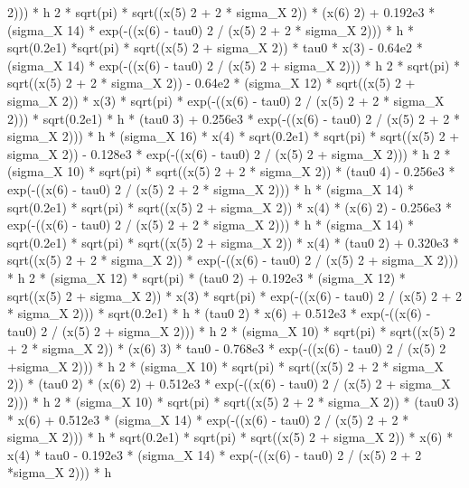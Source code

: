 \begin{maplegroup}
 2))) * h  2 * sqrt(pi) * sqrt((x(5)  2 + 2 * sigma\_X  2)) * (x(6)  2) + 0.192e3 * (sigma\_X  14) * exp(-((x(6) - tau0)  2 / (x(5)  2 + 2 * sigma\_X  2))) * h * sqrt(0.2e1) *sqrt(pi) * sqrt((x(5)  2 + sigma\_X  2)) * tau0 * x(3) - 0.64e2 * (sigma\_X  14) * exp(-((x(6) - tau0)  2 / (x(5)  2 + sigma\_X  2))) * h  2 * sqrt(pi) * sqrt((x(5)  2 + 2 * sigma\_X  2)) - 0.64e2 * (sigma\_X  12) * sqrt((x(5)  2 + sigma\_X  2)) * x(3) * sqrt(pi) * exp(-((x(6) - tau0)  2 / (x(5)  2 + 2 * sigma\_X  2))) * sqrt(0.2e1) * h * (tau0  3) + 0.256e3 * exp(-((x(6) - tau0)  2 / (x(5)  2 + 2 * sigma\_X  2))) * h * (sigma\_X  16) * x(4) * sqrt(0.2e1) * sqrt(pi) * sqrt((x(5)  2 + sigma\_X  2)) - 0.128e3 * exp(-((x(6) - tau0)  2 / (x(5)  2 + sigma\_X  2))) * h  2 * (sigma\_X  10) * sqrt(pi) * sqrt((x(5)  2 + 2 * sigma\_X  2)) * (tau0  4) - 0.256e3 * exp(-((x(6) - tau0)  2 / (x(5)  2 + 2 * sigma\_X  2))) * h * (sigma\_X  14) * sqrt(0.2e1) * sqrt(pi) * sqrt((x(5)  2 + sigma\_X  2)) * x(4) * (x(6)  2) - 0.256e3 * exp(-((x(6) - tau0)  2 / (x(5)  2 + 2 * sigma\_X  2))) * h * (sigma\_X  14) * sqrt(0.2e1) * sqrt(pi) * sqrt((x(5)  2 + sigma\_X  2)) * x(4) * (tau0  2) + 0.320e3 * sqrt((x(5) 2 + 2 * sigma\_X  2)) * exp(-((x(6) - tau0)  2 / (x(5)  2 + sigma\_X  2))) * h  2 * (sigma\_X  12) * sqrt(pi) * (tau0  2) + 0.192e3 * (sigma\_X  12) * sqrt((x(5)  2 + sigma\_X  2)) * x(3) * sqrt(pi) * exp(-((x(6) - tau0)  2 / (x(5)  2 + 2 * sigma\_X  2))) * sqrt(0.2e1) * h * (tau0  2) * x(6) + 0.512e3 * exp(-((x(6) - tau0)  2 / (x(5)  2 + sigma\_X  2))) * h  2 * (sigma\_X  10) * sqrt(pi) * sqrt((x(5)  2 + 2 * sigma\_X  2)) * (x(6)  3) * tau0 - 0.768e3 * exp(-((x(6) - tau0)  2 / (x(5)  2 +sigma\_X  2))) * h  2 * (sigma\_X  10) * sqrt(pi) * sqrt((x(5)  2 + 2 * sigma\_X  2)) * (tau0  2) * (x(6)  2) + 0.512e3 * exp(-((x(6) - tau0)  2 / (x(5)  2 + sigma\_X  2))) * h  2 * (sigma\_X  10) * sqrt(pi) * sqrt((x(5)  2 + 2 * sigma\_X  2)) * (tau0  3) * x(6) + 0.512e3 * (sigma\_X  14) * exp(-((x(6) - tau0)  2 / (x(5)  2 + 2 * sigma\_X  2))) * h * sqrt(0.2e1) * sqrt(pi) * sqrt((x(5)  2 + sigma\_X  2)) * x(6) * x(4) * tau0 - 0.192e3 * (sigma\_X  14) * exp(-((x(6) - tau0)  2 / (x(5)  2 + 2 *sigma\_X  2))) * h 
\end{maplegroup}
